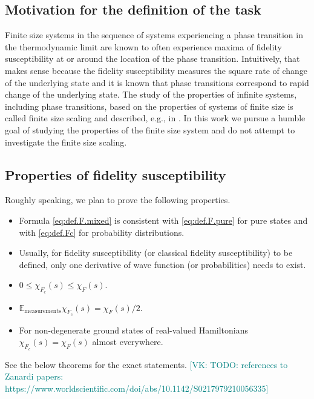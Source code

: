 \documentclass[
  american,aps,pra,reprint,floatfix,nofootinbib,superscriptaddress
]{revtex4-2}
\newcommand{\VK}[1]{\textcolor{teal}{[VK: #1]}}
\begin{document}
\subsection{Motivation for the definition of the task}
Finite size systems in the sequence of systems experiencing a phase transition
in the thermodynamic limit are known to often experience maxima of fidelity
susceptibility at or around the location of the phase transition. Intuitively,
that makes sense because the fidelity susceptibility measures the square rate of
change of the underlying state and it is known that phase transitions correspond
to rapid change of the underlying state. The study of the properties of infinite
systems, including phase transitions, based on the properties of systems
of finite size is called finite size scaling and described, e.g., in
\cite{cardy2012finite}. In this work we pursue a humble goal of studying
the properties of the finite size system and do not attempt to investigate
the finite size scaling.

\subsection{Properties of fidelity susceptibility}
\label{ss:fidelity-susceptibility}
Roughly speaking, we plan to prove the following properties.
\begin{itemize}
  \item Formula \eqref{eq:def.F.mixed} is consistent with \eqref{eq:def.F.pure}
    for pure states and with \eqref{eq:def.Fc} for probability distributions.
  \item Usually, for fidelity susceptibility (or classical fidelity
    susceptibility) to be defined, only one derivative of wave function
    (or probabilities) needs to exist.
  \item $0 \leq \chi_{F_c}(s) \leq \chi_F(s)$.
  \item $\mathbb{E}_{\textrm{measurements}} \chi_{F_c}(s) = \chi_F(s)/2$.
  \item For non-degenerate ground states of real-valued Hamiltonians
  $\chi_{F_c}(s) = \chi_F(s)$ almost everywhere.
\end{itemize}
See the below theorems for the exact statements.
\VK{TODO: references to Zanardi papers: https://www.worldscientific.com/doi/abs/10.1142/S0217979210056335}
\end{document}
